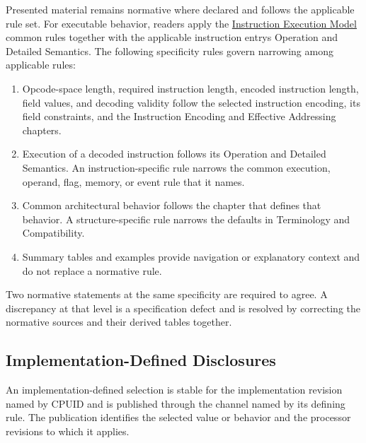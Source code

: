 Presented material remains normative where declared and follows the applicable
rule set. For executable behavior, readers apply the
\hyperref[page:instruction-execution-model]{Instruction Execution Model} common
rules together with the applicable instruction entry\textquotesingle{}s Operation and Detailed
Semantics. The following specificity rules govern narrowing among applicable
rules:

\begin{enumerate}
\item Opcode-space length, required instruction length, encoded instruction length, field values, and decoding validity follow the selected instruction encoding, its
field constraints, and the Instruction Encoding and Effective Addressing chapters.
\item Execution of a decoded instruction follows its Operation and Detailed Semantics. An instruction-specific rule
narrows the common execution, operand, flag, memory, or event rule that it names.
\item Common architectural behavior follows the chapter that defines that behavior. A structure-specific rule
narrows the defaults in Terminology and Compatibility.
\item Summary tables and examples provide navigation or explanatory context
and do not replace a normative rule.
\end{enumerate}

Two normative statements at the same specificity are required to agree. A discrepancy at that level is a
specification defect and is resolved by correcting the normative sources and their derived tables together.

\subsection{Implementation-Defined Disclosures}

An implementation-defined selection is stable for the implementation revision named by CPUID and is published
through the channel named by its defining rule. The publication identifies the selected value or behavior and the
processor revisions to which it applies.

